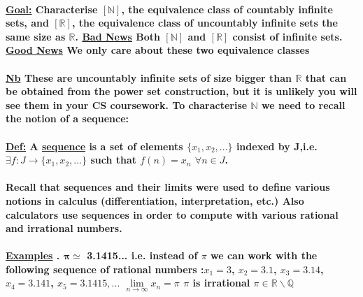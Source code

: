 \documentclass[10pt,a4paper]{article}
\begin{document}
\huge
\paragraph{\underline{Goal:} Characterise $\left[\mathbb{N}\right]$, the equivalence class of countably infinite sets, and $\left[\mathbb{R}\right]$, the equivalence class of uncountably infinite sets the same size as $\mathbb{R}$.\newline
\underline{Bad News} Both $\left[\mathbb{N}\right]$ and $\left[\mathbb{R}\right]$ consist of infinite sets.\newline
\underline{Good News} We only care about these two equivalence classes}

\paragraph{\underline{Nb} These are uncountably infinite sets of size bigger than $\mathbb{R}$ that can be obtained from the power set construction, but it is unlikely you will see them in your CS coursework.\newline
To characterise $\mathbb{N}$ we need to recall the notion of a sequence:\newline
}
\paragraph{\underline{Def:} A \underline{sequence} is a set of elements  $\lbrace x_{1},x_{2},...\rbrace$ indexed by J,\newline i.e. $\exists f: J \longrightarrow \lbrace x_{1},x_{2},...\rbrace$ such that $f(n) = x_{n}$   $ \forall n \in J$.}

\paragraph{Recall that sequences and their limits were used to define various notions in calculus (differentiation, interpretation, etc.) Also calculators use sequences in order to compute with various rational and irrational numbers.}
\newpage
\paragraph{\underline{Examples} . $\bm{\pi \simeq}$ 3.1415... i.e. instead of $\pi$ we can work with the following sequence of rational numbers :\newline $x_{1} = 3$, $x_{2} = 3.1$, $x_{3} = 3.14$,  $x_{4} = 3.141$, $x_{5} = 3.1415,...$ $\lim\limits_{n\to\infty}x_{n} = \pi$\newline
$\pi$ is irrational $\pi \in \mathbb{R} \backslash  \mathbb{Q}$}
\end{document}
